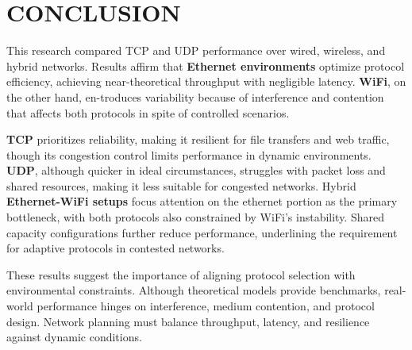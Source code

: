 \vspace{-0.15cm}

\section{CONCLUSION} \label{sec:conclusion}

    This research compared TCP and UDP performance over wired, wireless, and hybrid networks. 
    Results affirm that \textbf{Ethernet environments} optimize protocol efficiency, achieving near-theoretical throughput with negligible latency. 
    \textbf{WiFi}, on the other hand, en-troduces variability because of interference and contention that affects both protocols in spite of controlled scenarios.
    
    \noindent
    \textbf{TCP} prioritizes reliability, making it resilient for file transfers and web traffic, though its congestion control limits performance in dynamic environments. 
    \textbf{UDP}, although quicker in ideal circumstances, struggles with packet loss and shared resources, making it less suitable for congested networks.
    Hybrid \textbf{Ethernet-WiFi setups} focus attention on the ethernet portion as the primary bottleneck, with both protocols also constrained by WiFi’s instability. 
    Shared capacity configurations further reduce performance, underlining the requirement for adaptive protocols in contested networks.

    \noindent
    These results suggest the importance of aligning protocol selection with environmental constraints. 
    Although theoretical models provide benchmarks, real-world performance hinges on interference, medium contention, and protocol design. 
    Network planning must balance throughput, latency, and resilience against dynamic conditions.

        
